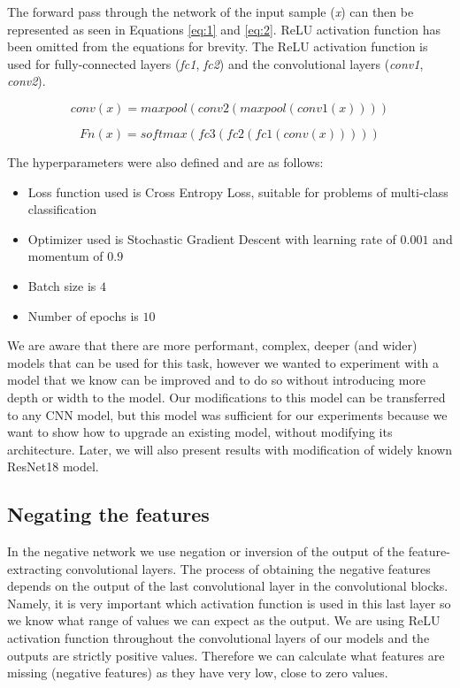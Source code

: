 \documentclass[b5paper]{book}
\let\cite\parencite
\begin{document}
The forward pass through the network of the input sample (\emph{x}) can then be represented as seen in Equations \ref{eq:1} and \ref{eq:2}. ReLU activation function has been omitted from the equations for brevity. The ReLU activation function is used for fully-connected layers (\emph{fc1}, \emph{fc2}) and the convolutional layers (\emph{conv1}, \emph{conv2}).

\begin{equation}\label{eq:1}
conv(x) = maxpool(conv2(maxpool(conv1(x))))
\end{equation}

\begin{equation}\label{eq:2}
Fn(x) = softmax(fc3(fc2(fc1(conv(x)))))
\end{equation}

The hyperparameters were also defined and are as follows:

\begin{itemize}
    \item Loss function used is Cross Entropy Loss, suitable for problems of multi-class classification
    \item Optimizer used is Stochastic Gradient Descent with learning rate of \(0.001\) and momentum of \(0.9\)
    \item Batch size is \(4\)
    \item Number of epochs is \(10\)
\end{itemize}

We are aware that there are more performant, complex, deeper (and wider) models that can be used for this task, however we wanted to experiment with a model that we know can be improved and to do so without introducing more depth or width to the model. Our modifications to this model can be transferred to any CNN model, but this model was sufficient for our experiments because we want to show how to upgrade an existing model, without modifying its architecture. Later, we will also present results with modification of widely known ResNet18 \cite{he2016deep} model.

\subsection{Negating the features}
\label{negation}

In the negative network we use negation or inversion of the output of the feature-extracting convolutional layers. The process of obtaining the negative features depends on the output of the last convolutional layer in the convolutional blocks. Namely, it is very important which activation function is used in this last layer so we know what range of values we can expect as the output. We are using ReLU activation function throughout the convolutional layers of our models and the outputs are strictly positive values. Therefore we can calculate what features are missing (negative features) as they have very low, close to zero values. 
\end{document}
